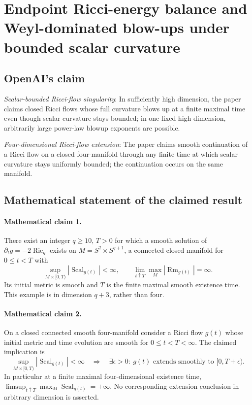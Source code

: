 \documentclass[11pt]{article}
\begin{document}
\section*{Endpoint Ricci-energy balance and Weyl-dominated blow-ups under bounded scalar curvature}

\subsection{OpenAI's claim}
\textit{Scalar-bounded Ricci-flow singularity}: In sufficiently high dimension, the paper claims closed Ricci flows whose full curvature blows up at a finite maximal time even though scalar curvature stays bounded; in one fixed high dimension, arbitrarily large power-law blowup exponents are possible.

\textit{Four-dimensional Ricci-flow extension}: The paper claims smooth continuation of a Ricci flow on a closed four-manifold through any finite time at which scalar curvature stays uniformly bounded; the continuation occurs on the same manifold.

\subsection{Mathematical statement of the claimed result}
\paragraph{Mathematical claim 1.} There exist an integer $q\ge10$, $T>0$ for which a smooth solution of $\partial_tg=-2\operatorname{Ric}_g$ exists on $M=S^2\times S^{q+1}$, a connected closed manifold for $0\le t<T$ with \[\sup_{M\times[0,T)}|\operatorname{Scal}_{g(t)}|<\infty,\qquad\lim_{t\uparrow T}\max_M|\operatorname{Rm}_{g(t)}|=\infty.\] Its initial metric is smooth and $T$ is the finite maximal smooth existence time. This example is in dimension $q+3$, rather than four.

\paragraph{Mathematical claim 2.} On a closed connected smooth four-manifold consider a Ricci flow $g(t)$ whose initial metric and time evolution are smooth for $0\le t<T<\infty$. The claimed implication is \[\sup_{M\times[0,T)}|\operatorname{Scal}_{g(t)}|<\infty\quad\Longrightarrow\quad\exists\epsilon>0:\ g(t)\text{ extends smoothly to }[0,T+\epsilon).\] In particular at a finite maximal four-dimensional existence time, $\limsup_{t\uparrow T}\max_M\operatorname{Scal}_{g(t)}=+\infty$. No corresponding extension conclusion in arbitrary dimension is asserted.
\end{document}
